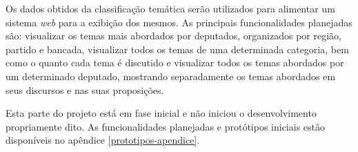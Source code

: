 Os dados obtidos da classificação temática serão utilizados para alimentar um sistema \textit{web} para a exibição dos
mesmos. As principais funcionalidades planejadas são: visualizar os temas mais abordados por deputados, organizados por região, partido e bancada, visualizar todos os temas de uma determinada categoria, bem como o quanto cada tema é discutido e visualizar todos os temas abordados por um determinado deputado, mostrando separadamente os temas abordados em seus discursos e nas suas proposições.

Esta parte do projeto está em fase inicial e não iniciou o desenvolvimento propriamente dito. As funcionalidades planejadas e protótipos iniciais estão disponíveis no apêndice \ref{prototipos-apendice}.
